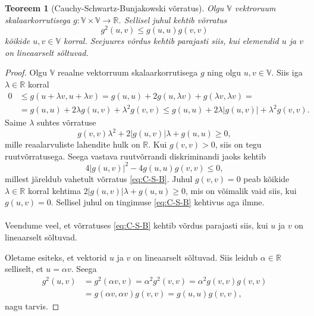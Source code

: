 \documentclass[12pt]{article}
\theoremstyle{plain}
\newtheorem{teoreem}{Teoreem}[section]
\theoremstyle{definition}
\numberwithin{equation}{section}
\def\R{{\mathbb R}}
\def\V{{\mathbb V}}
\begin{document}
\begin{teoreem}[Cauchy-Schwartz-Bunjakowski võrratus] 
\textnormal{\cite[teoreem II.1.1.]{FA2}} \label{teoreem:C-S-B}
Olgu $\V$ vektroruum skalaarkorrutisega 
$g : \V \times \V \rightarrow \R$. Sellisel juhul 
kehtib võrratus
\begin{equation} \label{eq:C-S-B}
g^2 \left(u, v \right) \leq g \left(u, u \right) 
g \left(v, v \right)
\end{equation}
kõikide $u, v \in \V$ korral. Seejuures võrdus kehtib parajasti 
siis, kui elemendid $u$ ja $v$ on lineaarselt sõltuvad.
\end{teoreem}

\begin{proof}
Olgu $\V$ reaalne vektorruum skalaarkorrutisega $g$ ning olgu 
$u, v \in \V$. Siis iga $\lambda \in \R$ korral
\begin{align*}
0 &\leq g\left(u+\lambda v,u+\lambda v\right) = 
g\left(u,u\right) + 2g\left(u, \lambda v \right) + 
g\left(\lambda v, \lambda v\right) = \\
&= g\left(u,u\right) + 2\lambda g\left(u, v \right) + 
\lambda^2 g\left(v,v\right) \leq g\left(u,u\right) + 
2\lambda | g\left(u, v \right)| + \lambda^2 g\left(v,v\right).
\end{align*}
Saime $\lambda$ suhtes võrratuse
\begin{equation*}
g\left(v,v\right)\lambda^2 + 2|g\left(u, v \right)|\lambda + 
g\left(u,u\right) \geq 0,
\end{equation*}
mille reaalarvuliste lahendite hulk on $\R$. Kui 
$g\left(v,v\right) > 0$, siis on tegu ruut\-võrratusega. 
Seega vastava ruutvõrrandi 
diskriminandi jaoks kehtib
\begin{equation*}
4|g\left(u,v\right)|^2 - 4g\left(u,u\right)g\left(v,v\right) \leq 0,
\end{equation*}
millest järeldub vahetult võrratus \ref{eq:C-S-B}. Juhul 
$g\left(v,v\right) = 0$ peab kõikide $\lambda \in \R$ korral kehtima 
$2|g\left(u,v\right)|\lambda + g\left(u,u\right) \geq 0$, mis on 
võimalik vaid siis, kui $g\left(u,v\right) = 0$. Sellisel juhul on 
tingimuse \ref{eq:C-S-B} kehtivus aga ilmne.
\paragraph{}
Veendume veel, et võrratuses \ref{eq:C-S-B} kehtib võrdus parajasti 
siis, kui $u$ ja $v$ on lineaarselt sõltuvad.

Oletame esiteks, et vektorid $u$ ja $v$ on lineaarselt sõltuvad. 
Siis leidub $\alpha \in \R$ selliselt, et $u = \alpha v$. Seega
\begin{align*}
g^2\left(u,v\right) &= g^2 \left(\alpha v,v\right) = 
\alpha^2 g^2 \left(v,v\right) = 
\alpha^2 g \left(v,v\right) g \left(v,v\right) \\
&= g \left(\alpha v,\alpha v\right)g \left( v,v\right) = 
g \left(u,u\right)g \left(v,v\right),
\end{align*}
nagu tarvis.


\end{proof}
\end{document}
